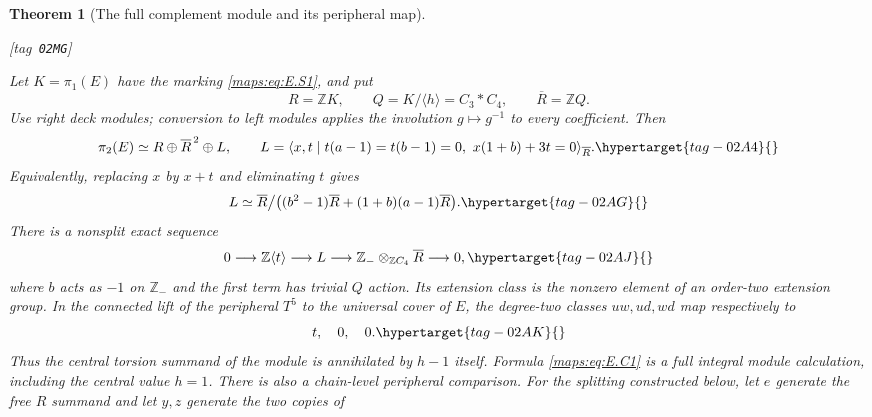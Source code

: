 \documentclass[11pt,a4paper]{article}
\numberwithin{equation}{section}
\newtheorem{theorem}{Theorem}[section]
\theoremstyle{definition}
\newcommand{\StatementRecord}[4]{{\upshape\footnotesize[tag~\texttt{#3}]}\enspace\ignorespaces}
\begin{document}
\begin{theorem}[The full complement module and its peripheral map]\hypertarget{tag-02MG}{}\label{maps:src:E.2.16}
\StatementRecord{maps:src:E.2.16}{proved}{02MG}{\eqref{maps:eq:E.S1}, \cref{maps:src:E.2.17}, \cref{maps:src:E.2.21}, \cref{maps:src:E.2.12}, \eqref{maps:eq:E.C5}, \eqref{maps:eq:E.C8}, \eqref{maps:eq:E.C11}, \eqref{maps:eq:E.C7}, \eqref{maps:eq:E.C14}, \eqref{maps:eq:E.C12}, \eqref{maps:eq:E.C16}, \eqref{maps:eq:E.C17}, \cref{maps:src:E.2.6}}


Let $K=\pi_1(E)$ have the marking \eqref{maps:eq:E.S1}, and put
\[
 R=\mathbb ZK,\qquad Q=K/\langle h\rangle=C_3*C_4,
 \qquad \overline R=\mathbb ZQ.
\]
Use right deck modules; conversion to left modules applies the
involution $g\mapsto g^{-1}$ to every coefficient. Then
\begin{equation}
 \pi_2(E)\simeq R\oplus\overline R^{\,2}\oplus L,
 \qquad
 L=\langle x,t\mid t(a-1)=t(b-1)=0,
                         \ x(1+b)+3t=0\rangle_{\overline R}.
 \hypertarget{tag-02A4}{}\label{maps:eq:E.C1}
\end{equation}
Equivalently, replacing $x$ by $x+t$ and eliminating $t$ gives
\begin{equation}
 L\simeq\overline R\big/
       \big((b^2-1)\overline R+(1+b)(a-1)\overline R\big).
 \hypertarget{tag-02AG}{}\label{maps:eq:E.C2}
\end{equation}
There is a nonsplit exact sequence
\begin{equation}
 0\longrightarrow\mathbb Z\langle t\rangle
  \longrightarrow L\longrightarrow
  \mathbb Z_{-}\otimes_{\mathbb ZC_4}\overline R
  \longrightarrow0,
 \hypertarget{tag-02AJ}{}\label{maps:eq:E.C3}
\end{equation}
where $b$ acts as $-1$ on $\mathbb Z_{-}$ and the first term
has trivial $Q$ action. Its extension class is the nonzero
element of an order-two extension group. In the connected
lift of the peripheral $T^5$ to the universal cover of $E$,
the degree-two classes $uw,ud,wd$ map respectively to
\begin{equation}
                           t,\quad0,\quad0.
 \hypertarget{tag-02AK}{}\label{maps:eq:E.C4}
\end{equation}
Thus the central torsion summand of the module is annihilated
by $h-1$ itself. Formula \eqref{maps:eq:E.C1} is a full integral module
calculation, including the central value $h=1$.  There is also a chain-level peripheral comparison.
For the splitting constructed below, let $e$ generate the
free $R$ summand and let $y,z$ generate the two copies of

\end{theorem}
\end{document}
